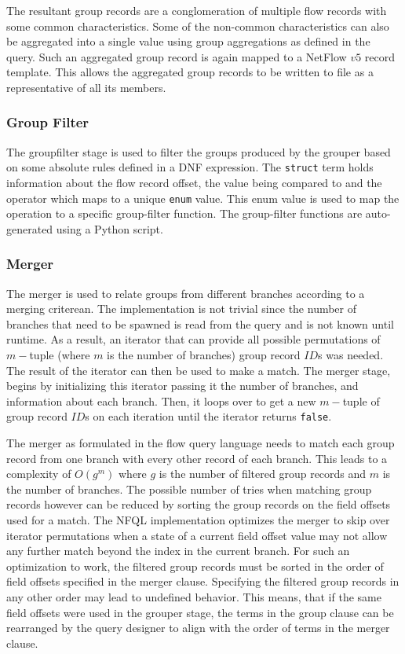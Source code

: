 The resultant group records are a conglomeration of multiple flow records with
some common characteristics. Some of the non-common characteristics can also
be aggregated into a single value using group aggregations as defined in the
query. Such an aggregated group record is again mapped to a NetFlow $v5$
record template. This allows the aggregated group records to be written to
file as a representative of all its members.

\subsubsection{Group Filter} The groupfilter stage is used to filter the
groups produced by the grouper based on some absolute rules defined in a
\ac{DNF} expression. The \texttt{struct} term holds information about the flow
record offset, the value being compared to and the operator which maps to a
unique \texttt{enum} value.  This enum value is used to map the operation to a
specific group-filter function. The group-filter functions are auto-generated
using a Python script.

\subsubsection{Merger}

The merger is used to relate groups from different branches according to a
merging criterean. The implementation is not trivial since the number of
branches that need to be spawned is read from the query and is not known until
runtime. As a result, an iterator that can provide all possible permutations
of $m-$tuple (where $m$ is the number of branches) group record $ID$s was
needed.  The result of the iterator can then be used to make a match. The
merger stage, begins by initializing this iterator passing it the number of
branches, and information about each branch. Then, it loops over to get a new
$m-$tuple of group record $ID$s on each iteration until the iterator returns
\texttt{false}.

The merger as formulated in the flow query language needs to match each group
record from one branch with every other record of each branch. This leads to a
complexity of $O(g^m)$ where $g$ is the number of filtered group records and
$m$ is the number of branches. The possible number of tries when matching
group records however can be reduced by sorting the group records on the field
offsets used for a match. The \ac{NFQL} implementation optimizes the merger to
skip over iterator permutations when a state of a current field offset value
may not allow any further match beyond the index in the current branch.  For
such an optimization to work, the filtered group records must be sorted in the
order of field offsets specified in the merger clause. Specifying the filtered
group records in any other order may lead to undefined behavior. This means,
that if the same field offsets were used in the grouper stage, the terms in
the group clause can be rearranged by the query designer to align with the
order of terms in the merger clause.


